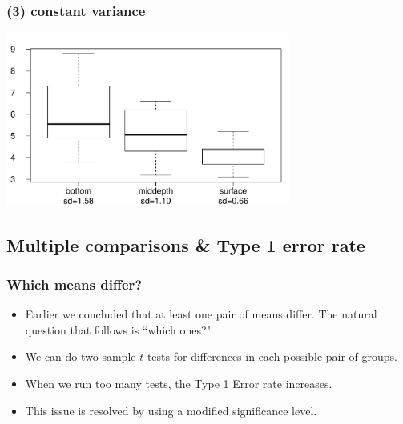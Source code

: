
\begin{frame}[fragile]
\frametitle{(3) constant variance}


\begin{center}
\includegraphics[width=0.7\textwidth]{7-5_anova/figures/aldrin/homo}
\end{center}

\end{frame}


\subsection{Multiple comparisons \& Type 1 error rate}


\begin{frame}
\frametitle{Which means differ?}

\begin{itemize}

\item Earlier we concluded that at least one pair of means differ. The natural question that follows is ``which ones?"

\pause

\item We can do two sample $t$ tests for differences in each possible pair of groups.

\pause

\end{itemize}


\pause

\begin{itemize}

\item When we run too many tests, the Type 1 Error rate increases.

\item This issue is resolved by using a modified significance level.

\end{itemize}

\end{frame}

